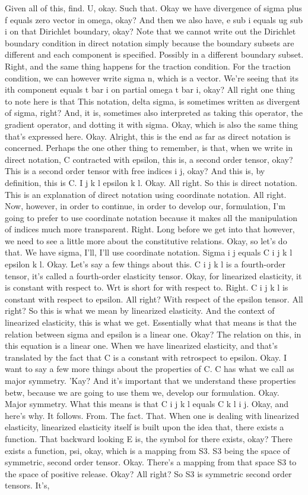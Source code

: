 \documentclass[10pt]{article}
\begin{document}
Given all of this, find. U, okay. Such that. Okay we have divergence of sigma plus f equals zero vector in omega, okay? And then we also have, e sub i equals ug sub i on that Dirichlet boundary, okay? Note that we cannot write out the Dirichlet boundary condition in direct notation simply because the boundary subsets are different and each component is specified. Possibly in a different boundary subset. Right, and the same thing happens for the traction condition. For the traction condition, we can however write sigma n, which is a vector. We're seeing that its ith component equals t bar i on partial omega t bar i, okay? All right one thing to note here is that This notation, delta sigma, is sometimes written as divergent of sigma, right? And, it is, sometimes also interpreted as taking this operator, the gradient operator, and dotting it with sigma. Okay, which is also the same thing that's expressed here. Okay. Alright, this is the end as far as direct notation is concerned. Perhaps the one other thing to remember, is that, when we write in direct notation, C contracted with epsilon, this is, a second order tensor, okay? This is a second order tensor with free indices i j, okay? And this is, by definition, this is C. I j k l epsilon k l. Okay. All right. So this is direct notation. This is an explanation of direct notation using coordinate notation. All right. Now, however, in order to continue, in order to develop our, formulation, I'm going to prefer to use coordinate notation because it makes all the manipulation of indices much more transparent. Right. Long before we get into that however, we need to see a little more about the constitutive relations. Okay, so let's do that. We have sigma, I'll, I'll use coordinate notation. Sigma i j equals C i j k l epsilon k l. Okay. Let's say a few things about this. C i j k l is a fourth-order tensor, it's called a fourth-order elasticity tensor. Okay, for linearized elasticity, it is constant with respect to. Wrt is short for with respect to. Right. C i j k l is constant with respect to epsilon. All right? With respect of the epsilon tensor. All right? So this is what we mean by linearized elasticity. And the context of linearized elasticity, this is what we get. Essentially what that means is that the relation between sigma and epsilon is a linear one. Okay? The relation on this, in this equation is a linear one. When we have linearized elasticity, and that's translated by the fact that C is a constant with retrospect to epsilon. Okay. I want to say a few more things about the properties of C. C has what we call as major symmetry. 'Kay? And it's important that we understand these properties betw, because we are going to use them we, develop our formulation. Okay. Major symmetry. What this means is that C i j k l equals C k l i j. Okay, and here's why. It follows. From. The fact. That. When one is dealing with linearized elasticity, linearized elasticity itself is built upon the idea that, there exists a function. That backward looking E is, the symbol for there exists, okay? There exists a function, psi, okay, which is a mapping from S3. S3 being the space of symmetric, second order tensor. Okay. There's a mapping from that space S3 to the space of positive release. Okay? All right? So S3 is symmetric second order tensors. It's, 
\end{document}

